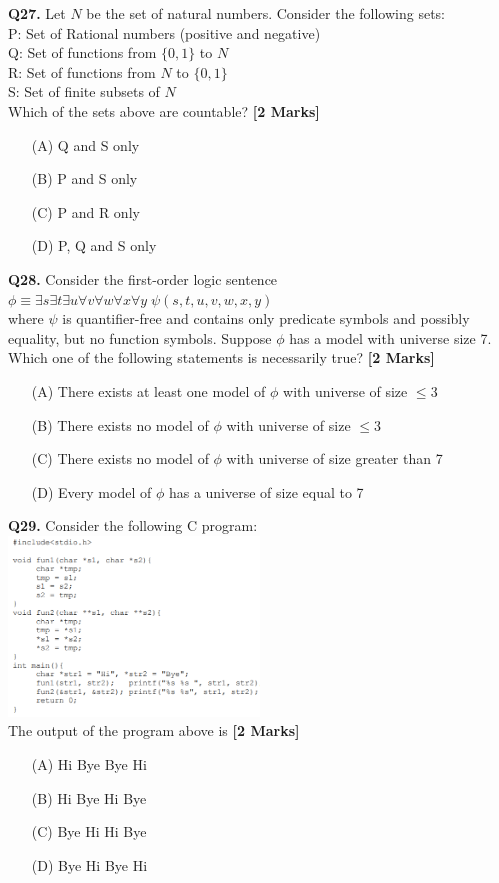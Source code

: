 \documentclass[11pt]{article}
\newcommand{\questionb}[2]{
    \noindent\textbf{Q#2.} #1 \hfill \textbf{[2 Marks]}
}
\begin{document}
\questionb{Let \( N \) be the set of natural numbers. Consider the following sets:\\
P: Set of Rational numbers (positive and negative)\\
Q: Set of functions from \( \{0,1\} \) to \( N \)\\
R: Set of functions from \( N \) to \( \{0,1\} \)\\
S: Set of finite subsets of \( N \)\\
Which of the sets above are countable?}{27}
\begin{enumerate}
    \item[(A)] Q and S only
    \item[(B)] P and S only
    \item[(C)] P and R only
    \item[(D)] P, Q and S only
\end{enumerate}
\vspace{0.5cm}

\questionb{Consider the first-order logic sentence\\
\( \phi \equiv \exists s \exists t \exists u \forall v \forall w \forall x \forall y \; \psi(s,t,u,v,w,x,y) \)\\
where \( \psi \) is quantifier-free and contains only predicate symbols and possibly equality, but no function symbols. Suppose \( \phi \) has a model with universe size 7. Which one of the following statements is necessarily true?}{28}
\begin{enumerate}
    \item[(A)] There exists at least one model of \( \phi \) with universe of size \( \leq 3 \)
    \item[(B)] There exists no model of \( \phi \) with universe of size \( \leq 3 \)
    \item[(C)] There exists no model of \( \phi \) with universe of size greater than 7
    \item[(D)] Every model of \( \phi \) has a universe of size equal to 7
\end{enumerate}
\vspace{0.5cm}

\questionb{Consider the following C program:\\
\includegraphics[width=0.5\textwidth]{figures/29}\\
The output of the program above is}{29}
\begin{enumerate}
    \item[(A)] Hi Bye Bye Hi
    \item[(B)] Hi Bye Hi Bye
    \item[(C)] Bye Hi Hi Bye
    \item[(D)] Bye Hi Bye Hi
\end{enumerate}
\vspace{0.5cm}
\end{document}
